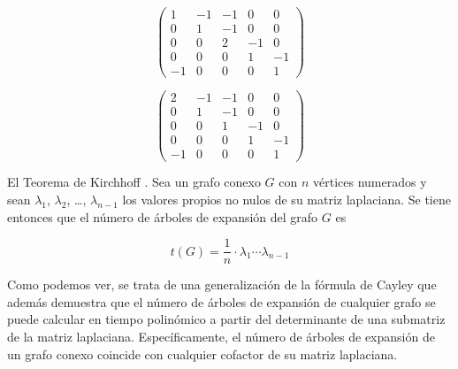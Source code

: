 \begin{exampleth}
\begin{equation}
\begin{pmatrix}
1 & -1 & -1 & 0 & 0\\
0 & 1 & -1 & 0 & 0\\
0 & 0 & 2 & -1 & 0\\
0 & 0 & 0 & 1 & -1\\
-1 & 0 & 0 & 0 & 1
\end{pmatrix}
\label{eq:inlaplacian}
\end{equation}

\begin{equation}
\begin{pmatrix}
2 & -1 & -1 & 0 & 0\\
0 & 1 & -1 & 0 & 0\\
0 & 0 & 1 & -1 & 0\\
0 & 0 & 0 & 1 & -1\\
-1 & 0 & 0 & 0 & 1
\end{pmatrix}
\label{eq:outlaplacian}
\end{equation}
\end{exampleth}

\begin{theorem}\label{theorem}
El Teorema de Kirchhoff \cite{ORIE6334}. Sea un grafo conexo $G$ con $n$ vértices numerados y sean $\lambda_1$, $\lambda_2$, \dots, $\lambda_{n-1}$ los valores propios no nulos de su matriz laplaciana. Se tiene entonces que el número de árboles de expansión del grafo $G$ es

\begin{equation}
t(G) = \frac{1}{n} \cdot \lambda_1 \cdots \lambda_{n-1}
\end{equation}

Como podemos ver, se trata de una generalización de la fórmula de Cayley que además demuestra que el número de árboles de expansión de cualquier grafo se puede calcular en tiempo polinómico a partir del determinante de una submatriz de la matriz laplaciana. Específicamente, el número de árboles de expansión de un grafo conexo coincide con cualquier cofactor de su matriz laplaciana.
\end{theorem}


